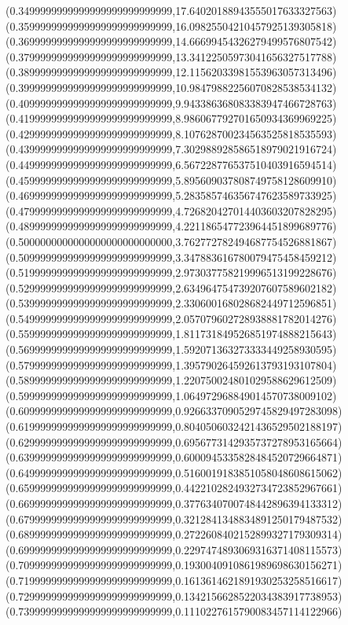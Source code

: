 \documentclass[11pt]{report}
\begin{document}
\begin{center}
  (0.3499999999999999999999999999,17.64020188943555017633327563)
  (0.3599999999999999999999999999,16.09825504210457925139305818)
  (0.3699999999999999999999999999,14.66699454326279499576807542)
  (0.3799999999999999999999999999,13.34122505973041656327517788)
  (0.3899999999999999999999999999,12.11562033981553963057313496)
  (0.3999999999999999999999999999,10.98479882256070828538534132)
  (0.4099999999999999999999999999,9.943386368083383947466728763)
  (0.4199999999999999999999999999,8.986067792701650934369969225)
  (0.4299999999999999999999999999,8.107628700234563525818535593)
  (0.4399999999999999999999999999,7.302988928586518979021916724)
  (0.4499999999999999999999999999,6.567228776537510403916594514)
  (0.4599999999999999999999999999,5.895609037808749758128609910)
  (0.4699999999999999999999999999,5.283585746356747623589733925)
  (0.4799999999999999999999999999,4.726820427014403603207828295)
  (0.4899999999999999999999999999,4.221186547723964451899689776)
  (0.5000000000000000000000000000,3.762772782494687754526881867)
  (0.5099999999999999999999999999,3.347883616780079475458459212)
  (0.5199999999999999999999999999,2.973037758219996513199228676)
  (0.5299999999999999999999999999,2.634964754739207607589602182)
  (0.5399999999999999999999999999,2.330600168028682449712596851)
  (0.5499999999999999999999999999,2.057079602728938881782014276)
  (0.5599999999999999999999999999,1.811731849526851974888215643)
  (0.5699999999999999999999999999,1.592071363273333449258930595)
  (0.5799999999999999999999999999,1.395790264592613793193107804)
  (0.5899999999999999999999999999,1.220750024801029588629612509)
  (0.5999999999999999999999999999,1.064972968849014570738009102)
  (0.6099999999999999999999999999,0.9266337090529745829497283098)
  (0.6199999999999999999999999999,0.8040506032421436529502188197)
  (0.6299999999999999999999999999,0.6956773142935737278953165664)
  (0.6399999999999999999999999999,0.6000945335828484520729664871)
  (0.6499999999999999999999999999,0.5160019183851058048608615062)
  (0.6599999999999999999999999999,0.4422102824932734723852967661)
  (0.6699999999999999999999999999,0.3776340700748442896394133312)
  (0.6799999999999999999999999999,0.3212841348834891250179487532)
  (0.6899999999999999999999999999,0.2722608402152899327179309314)
  (0.6999999999999999999999999999,0.2297474893069316371408115573)
  (0.7099999999999999999999999999,0.1930040910861989698630156271)
  (0.7199999999999999999999999999,0.1613614621891930253258516617)
  (0.7299999999999999999999999999,0.1342156628522034383917738953)
  (0.7399999999999999999999999999,0.1110227615790083457114122966)

\end{center}
\end{document}
